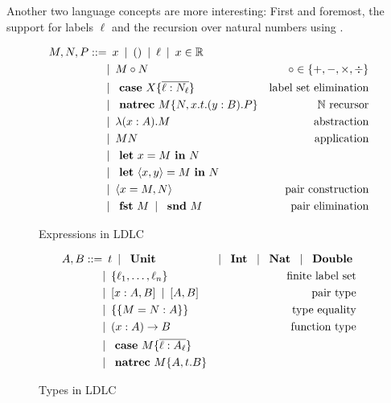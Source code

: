Another two language concepts are more interesting: First and foremost, the support for labels $\ell$ and the recursion over natural numbers using \natrec.

\begin{figure}
\begin{align*}
 M,N,P ::=
    & \enspace x \enspace|\enspace
      () \enspace|\enspace
      \ell \enspace|\enspace
      x \in \mathbb{R} \\
    & |\enspace M \circ N & \circ \in \{+,-,\times,\div\} \\
    & |\enspace \text{ \textbf{case} } X \{\overline{\ell : N_\ell}\} & \text{label set elimination} \\
    & |\enspace \text{ \textbf{natrec} } M \{ N, x . t . (y : B) . P \} & \mathbb{N}\text{ recursor} \\
    & |\enspace \lambda (x : A).M & \text{abstraction} \\
    & |\enspace M N & \text{application}\\
    & |\enspace \text{ \textbf{let} } x = M \text{ \textbf{in} } N \\
    & |\enspace \text{ \textbf{let} } \langle x, y \rangle = M \text{ \textbf{in} } N \\
    & |\enspace \langle x = M, N \rangle & \text{pair construction}\\
    & |\enspace \text{ \textbf{fst} } M \enspace|\enspace \text{ \textbf{snd} } M & \text{pair elimination}
\end{align*}
\caption{Expressions in LDLC}
\label{fig:ldlc-expressions}
\end{figure}

\begin{figure}
\begin{align*}
 A, B ::=
    & \enspace t \enspace|\enspace
      \text{ \textbf{Unit} }
    & |\enspace \text{ \textbf{Int} } \enspace|\enspace
      \text{ \textbf{Nat} } \enspace|\enspace
      \text{ \textbf{Double} } \\
    & |\enspace \{ \ell_1, \dots, \ell_n \} & \text{finite label set} \\
    & |\enspace [x:A,B] \enspace|\enspace [A,B] & \text{pair type} \\
    & |\enspace \{\{ M = N : A \}\} & \text{type equality} \\
    & |\enspace (x:A) \rightarrow B & \text{function type} \\
    & |\enspace \text{ \textbf{case} } M \{\overline{\ell : A_\ell}\} \\
    & |\enspace \text{ \textbf{natrec} } M \{ A, t.B \}
\end{align*}
\caption{Types in LDLC}
\label{fig:ldlc-types}
\end{figure}

